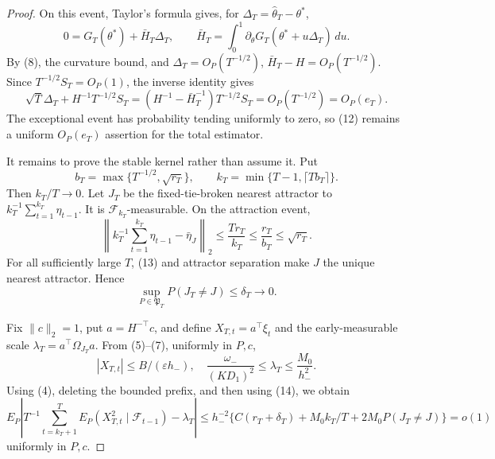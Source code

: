 \documentclass{article}
\begin{document}
\begin{proof}
On this event, Taylor's formula gives, for \(\Delta_T=\widehat\theta_T-\theta^*\),
\[
 0=G_T(\theta^*)+\bar H_T\Delta_T,
 \qquad
 \bar H_T=\int_0^1\partial_\theta G_T(\theta^*+u\Delta_T)\,du.
\]
By (8), the curvature bound, and \(\Delta_T=O_P(T^{-1/2})\), \(\bar H_T-H=O_P(T^{-1/2})\).  Since \(T^{-1/2}S_T=O_P(1)\), the inverse identity gives
\[
 \sqrt T\Delta_T+H^{-1}T^{-1/2}S_T
 =(H^{-1}-\bar H_T^{-1})T^{-1/2}S_T=O_P(T^{-1/2})=O_P(e_T).               \tag{12}
\]
The exceptional event has probability tending uniformly to zero, so (12) remains a uniform \(O_P(e_T)\) assertion for the total estimator.

It remains to prove the stable kernel rather than assume it.  Put
\[
 b_T=\max\{T^{-1/2},\sqrt{r_T}\},
 \qquad
 k_T=\min\{T-1,\lceil Tb_T\rceil\}.
\]
Then \(k_T/T\to0\).  Let \(J_T\) be the fixed-tie-broken nearest attractor to \(k_T^{-1}\sum_{t=1}^{k_T}\eta_{t-1}\).  It is \(\mathcal F_{k_T}\)-measurable.  On the attraction event,
\[
 \left\|k_T^{-1}\sum_{t=1}^{k_T}\eta_{t-1}-\bar\eta_J\right\|_2
 \le \frac{Tr_T}{k_T}\le\frac{r_T}{b_T}\le\sqrt{r_T}.                 \tag{13}
\]
For all sufficiently large \(T\), (13) and attractor separation make \(J\) the unique nearest attractor.  Hence
\[
 \sup_{P\in\mathfrak P_T}P(J_T\ne J)\le\delta_T\longrightarrow0.        \tag{14}
\]

Fix \(\|c\|_2=1\), put \(a=H^{-\top}c\), and define \(X_{T,t}=a^\top\xi_t\) and the early-measurable scale \(\lambda_T=a^\top\Omega_{J_T}a\).  From (5)--(7), uniformly in \(P,c\),
\[
 |X_{T,t}|\le B/(\varepsilon h_-),
 \quad
 \frac{\omega_-}{(KD_1)^2}\le\lambda_T\le\frac{M_0}{h_-^2}.            \tag{15}
\]
Using (4), deleting the bounded prefix, and then using (14), we obtain
\[
 E_P\left|T^{-1}\sum_{t=k_T+1}^TE_P(X_{T,t}^2\mid\mathcal F_{t-1})-\lambda_T\right|
 \le h_-^{-2}\{C(r_T+\delta_T)+M_0k_T/T+2M_0P(J_T\ne J)\}=o(1)          \tag{16}
\]
uniformly in \(P,c\).


\end{proof}
\end{document}
